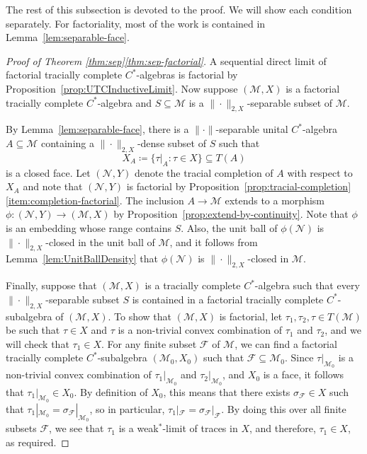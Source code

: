 \documentclass[a4paper,11pt]{amsart}
\theoremstyle{definition}
\numberwithin{equation}{section}
\numberwithin{theorem}{section}
\newcommand{\M}{\mathcal{M}}
\begin{document}
The rest of this subsection is devoted to the proof.  We will show each condition separately.  For factoriality, most of the work is contained in Lemma~\ref{lem:separable-face}.

\begin{proof}[Proof of Theorem \ref{thm:sep}\ref{thm:sep-factorial}]
	A sequential direct limit of factorial tracially complete $C^*$-algebras is factorial by Proposition~\ref{prop:UTCInductiveLimit}.  Now suppose $(\M, X)$ is a factorial tracially complete $C^*$-algebra and $S \subseteq \M$ is a $\|\cdot\|_{2, X}$-separable subset of $\M$.
	
	By Lemma~\ref{lem:separable-face}, there is a $\|\cdot\|$-separable unital $C^*$-algebra $A \subseteq \mathcal M$ containing a $\|\cdot\|_{2, X}$-dense subset of $S$ such that 
	\begin{equation}
		X_A \coloneqq \{ \tau|_A : \tau \in X \} \subseteq T(A)
	\end{equation}
	is a closed face.  Let $(\mathcal N, Y)$ denote the tracial completion of $A$ with respect to $X_A$ and note that $(\mathcal N, Y)$ is factorial by Proposition~\ref{prop:tracial-completion}\ref{item:completion-factorial}.  The inclusion $A \rightarrow \M$ extends to a morphism $\phi \colon (\mathcal N, Y) \rightarrow (\mathcal M, X)$ by Proposition~\ref{prop:extend-by-continuity}.  Note that $\phi$ is an embedding whose range contains $S$.  Also, the unit ball of $\phi(\mathcal N)$ is $\|\cdot\|_{2, X}$-closed in the unit ball of $\mathcal M$, and it follows from Lemma~\ref{lem:UnitBallDensity} that $\phi(\mathcal{N})$ is $\|\cdot\|_{2, X}$-closed in $\mathcal M$. 

Finally, suppose that $(\M,X)$ is a tracially complete $C^*$-algebra such that every $\|\cdot\|_{2,X}$-separable subset $S$ is contained in a factorial tracially complete $C^*$-subalgebra of $(\M,X)$.
To show that $(\M,X)$ is factorial, let $\tau_1,\tau_2,\tau \in T(\M)$ be such that $\tau \in X$ and $\tau$ is a non-trivial convex combination of $\tau_1$ and $\tau_2$, and we will check that $\tau_1 \in X$.
For any finite subset $\mathcal F$ of $\M$, we can find a factorial tracially complete $C^*$-subalgebra $(\M_0,X_0)$ such that $\mathcal F\subseteq \M_0$.
Since $\tau|_{\M_0}$ is a non-trivial convex combination of $\tau_1|_{\M_0}$ and $\tau_2|_{\M_0}$, and $X_0$ is a face, it follows that $\tau_1|_{\M_0} \in X_0$.
By definition of $X_0$, this means that there exists $\sigma_{\mathcal F} \in X$ such that $\tau_1|_{\M_0} = \sigma_{\mathcal F}|_{\M_0}$, so in particular, $\tau_1|_{\mathcal F} = \sigma_{\mathcal F}|_{\mathcal F}$.
By doing this over all finite subsets $\mathcal F$, we see that $\tau_1$ is a weak$^*$-limit of traces in $X$, and therefore, $\tau_1\in X$, as required.
\end{proof}
\end{document}

